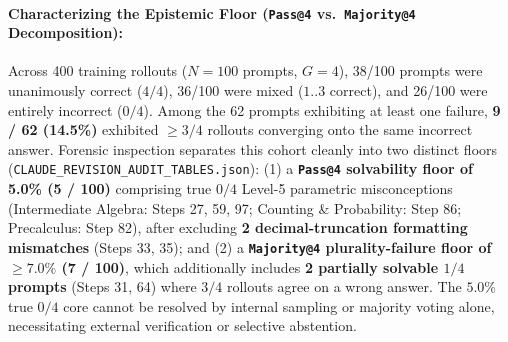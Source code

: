 \documentclass[11pt,a4paper]{article}
\begin{document}
\paragraph{Characterizing the Epistemic Floor (\texttt{Pass@4} vs.\ \texttt{Majority@4} Decomposition):}
Across 400 training rollouts ($N=100$ prompts, $G=4$), 38/100 prompts were unanimously correct ($4/4$), 36/100 were mixed ($1..3$ correct), and 26/100 were entirely incorrect ($0/4$). Among the 62 prompts exhibiting at least one failure, \textbf{9 / 62 (14.5\%)} exhibited $\ge 3/4$ rollouts converging onto the same incorrect answer. Forensic inspection separates this cohort cleanly into two distinct floors (\texttt{CLAUDE\_REVISION\_AUDIT\_TABLES.json}): (1) a \textbf{\texttt{Pass@4} solvability floor of 5.0\% (5 / 100)} comprising true $0/4$ Level-5 parametric misconceptions (Intermediate Algebra: Steps 27, 59, 97; Counting \& Probability: Step 86; Precalculus: Step 82), after excluding \textbf{2 decimal-truncation formatting mismatches} (Steps 33, 35); and (2) a \textbf{\texttt{Majority@4} plurality-failure floor of $\ge 7.0\%$ (7 / 100)}, which additionally includes \textbf{2 partially solvable $1/4$ prompts} (Steps 31, 64) where $3/4$ rollouts agree on a wrong answer. The $5.0\%$ true $0/4$ core cannot be resolved by internal sampling or majority voting alone, necessitating external verification or selective abstention.
\end{document}
